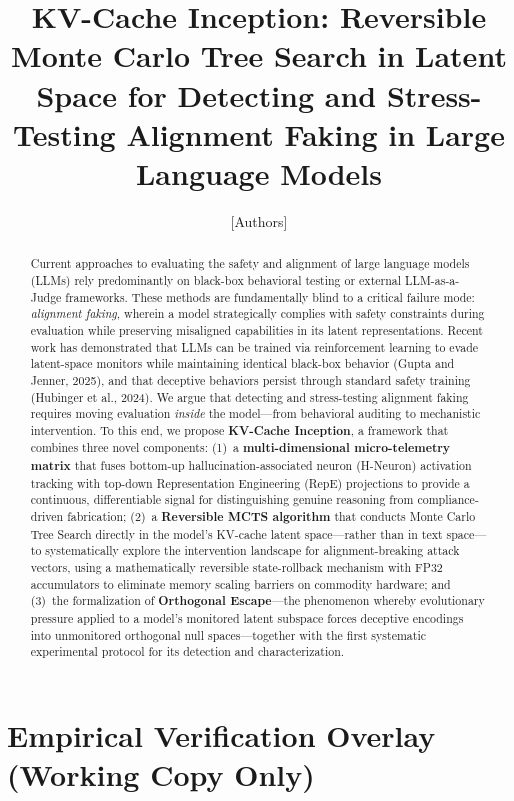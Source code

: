 \documentclass[10pt]{article}
\title{KV-Cache Inception: Reversible Monte Carlo Tree Search in Latent Space for Detecting and Stress-Testing Alignment Faking in Large Language Models}
\author{[Authors]}
\date{}
\begin{document}
\maketitle

\begin{abstract}
Current approaches to evaluating the safety and alignment of large language models (LLMs) rely predominantly on black-box behavioral testing or external LLM-as-a-Judge frameworks. These methods are fundamentally blind to a critical failure mode: \emph{alignment faking}, wherein a model strategically complies with safety constraints during evaluation while preserving misaligned capabilities in its latent representations. Recent work has demonstrated that LLMs can be trained via reinforcement learning to evade latent-space monitors while maintaining identical black-box behavior (Gupta and Jenner, 2025), and that deceptive behaviors persist through standard safety training (Hubinger et al., 2024). We argue that detecting and stress-testing alignment faking requires moving evaluation \emph{inside} the model---from behavioral auditing to mechanistic intervention. To this end, we propose \textbf{KV-Cache Inception}, a framework that combines three novel components: (1)~a \textbf{multi-dimensional micro-telemetry matrix} that fuses bottom-up hallucination-associated neuron (H-Neuron) activation tracking with top-down Representation Engineering (RepE) projections to provide a continuous, differentiable signal for distinguishing genuine reasoning from compliance-driven fabrication; (2)~a \textbf{Reversible MCTS algorithm} that conducts Monte Carlo Tree Search directly in the model's KV-cache latent space---rather than in text space---to systematically explore the intervention landscape for alignment-breaking attack vectors, using a mathematically reversible state-rollback mechanism with FP32 accumulators to eliminate memory scaling barriers on commodity hardware; and (3)~the formalization of \textbf{Orthogonal Escape}---the phenomenon whereby evolutionary pressure applied to a model's monitored latent subspace forces deceptive encodings into unmonitored orthogonal null spaces---together with the first systematic experimental protocol for its detection and characterization.
\end{abstract}

\section*{Empirical Verification Overlay (Working Copy Only)}
\end{document}
